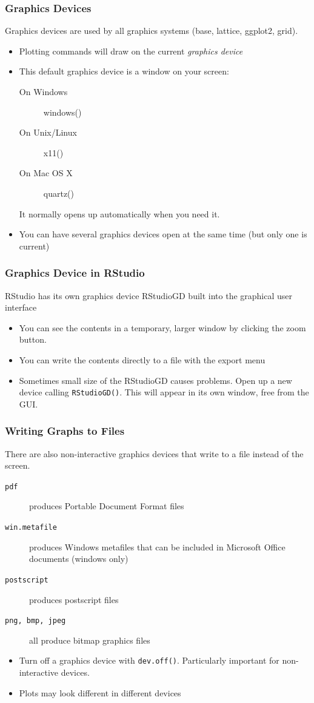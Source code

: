 \documentclass[xcolor=svgnames]{beamer}
\newcommand{\code}[1]{\texttt{#1}}
\begin{document}
\begin{frame}
  \frametitle{Graphics Devices}
  Graphics devices are used by all graphics systems (base, lattice, ggplot2, grid).
  \begin{itemize}      
  \item Plotting commands will draw on the current {\em graphics device}
  \item This default graphics device is a window on your screen:
  \begin{description}
  \item[On Windows] windows()
  \item[On Unix/Linux] x11()
  \item[On Mac OS X] quartz()
  \end{description}
  It normally opens up automatically when you need it.
  \item You can have several graphics devices open at the same time (but
    only one is current)
  \end{itemize}
\end{frame}

\begin{frame}
  \frametitle{Graphics Device in RStudio}

  RStudio has its own graphics device RStudioGD built into the graphical
  user interface
  \begin{itemize}
     \item You can see the contents in a temporary, larger window
     by clicking the zoom button.
     \item You can write the contents directly to a file with the export
     menu
     \item Sometimes small size of the RStudioGD causes problems. Open
     up a new device calling \texttt{RStudioGD()}. This will appear in
     its own window, free from the GUI.
  \end{itemize}

\end{frame}

\begin{frame}
  \frametitle{Writing Graphs to Files}
  
  There are also non-interactive graphics devices that write 
  to a file instead of the screen.
  \begin{description}
  \item[\code{pdf}] produces Portable Document Format files
  \item[\code{win.metafile}] produces Windows metafiles that can be included in      
  Microsoft Office documents (windows only)
  \item[\code{postscript}] produces postscript files
  \item[\code{png, bmp, jpeg}] all produce bitmap graphics files
  \end{description}
  \begin{itemize}
  \item Turn off a graphics device with \code{dev.off()}. Particularly
    important for non-interactive devices.
  \item Plots may look different in different devices
  \end{itemize}
\end{frame}
\end{document}
